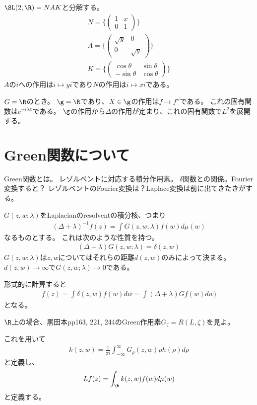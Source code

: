 \documentclass{jsarticle}
\begin{document}
$\SL(2,\R)=NAK$と分解する。
\begin{align*}
N=\{\begin{pmatrix}1&x\\0&1\end{pmatrix}\}\\
A=\{\begin{pmatrix}\sqrt{y}&0\\0&\sqrt{y}\end{pmatrix}\}\\
K=\{\begin{pmatrix}\cos\theta&\sin\theta\\-\sin\theta&\cos\theta\end{pmatrix}\}
\end{align*}
$A$の$i$への作用は$i\mapsto yi$であり$N$の作用は$i\mapsto xi$である。

$G=\R$のとき。
$\g=\R$であり、$X\in\g$の作用は$f\mapsto f''$である。
これの固有関数は$e^{\pm i\lambda x}$である。
$\g$の作用から$\Delta$の作用が定まり、これの固有関数で$L^2$を展開する。

\section{Green関数について}
Green関数とは。
レゾルベントに対応する積分作用素。
$\delta$関数との関係。Fourier変換すると？
レゾルベントのFourier変換は？Laplace変換は前に出てきたきがする。

$G(z,w;\lambda)$をLaplacianのresolventの積分核、つまり
\begin{align*}
(\Delta+\lambda)^{-1}f(z)=\int G(z,w;\lambda)f(w)d\mu(w)
\end{align*}
なるものとする。
これは次のような性質を持つ。
\begin{align*}
(\Delta+\lambda)G(z,w;\lambda)=\delta(z,w)
\end{align*}
$G(z,w;\lambda)$は$z,w$についてはそれらの距離$d(z,w)$のみによって決まる。
$d(z,w)\to\infty$で$G(z,w;\lambda)\to0$である。

形式的に計算すると
\begin{align*}
f(z)=\int\delta(z,w)f(w)dw=\int(\Delta+\lambda)Gf(w)dw)
\end{align*}
となる。

$\R$上の場合、黒田本pp163, 221, 244のGreen作用素$G_\zeta=R(L,\zeta)$を見よ。

これを用いて
\begin{align*}
k(z,w)=\frac{1}{\pi i}\int^\infty_{-\infty}G_\rho(z,w)\rho h(\rho)d\rho
\end{align*}
と定義し、
\begin{align*}
Lf(z)=\int_{\h}k(z,w)f(w)d\mu(w)
\end{align*}
と定義する。
\end{document}
